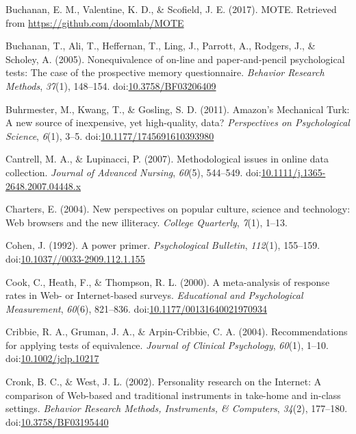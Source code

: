 \documentclass[english,man, mask]{apa6}
\theoremstyle{definition}
\theoremstyle{definition}
\theoremstyle{definition}
\theoremstyle{remark}
\begin{document}
\hypertarget{ref-Buchanan2017}{}
Buchanan, E. M., Valentine, K. D., \& Scofield, J. E. (2017). MOTE.
Retrieved from \url{https://github.com/doomlab/MOTE}

\hypertarget{ref-Buchanan2005}{}
Buchanan, T., Ali, T., Heffernan, T., Ling, J., Parrott, A., Rodgers,
J., \& Scholey, A. (2005). Nonequivalence of on-line and
paper-and-pencil psychological tests: The case of the prospective memory
questionnaire. \emph{Behavior Research Methods}, \emph{37}(1), 148--154.
doi:\href{https://doi.org/10.3758/BF03206409}{10.3758/BF03206409}

\hypertarget{ref-Buhrmester2011}{}
Buhrmester, M., Kwang, T., \& Gosling, S. D. (2011). Amazon's Mechanical
Turk: A new source of inexpensive, yet high-quality, data?
\emph{Perspectives on Psychological Science}, \emph{6}(1), 3--5.
doi:\href{https://doi.org/10.1177/1745691610393980}{10.1177/1745691610393980}

\hypertarget{ref-Cantrell2007}{}
Cantrell, M. A., \& Lupinacci, P. (2007). Methodological issues in
online data collection. \emph{Journal of Advanced Nursing},
\emph{60}(5), 544--549.
doi:\href{https://doi.org/10.1111/j.1365-2648.2007.04448.x}{10.1111/j.1365-2648.2007.04448.x}

\hypertarget{ref-Charters2004}{}
Charters, E. (2004). New perspectives on popular culture, science and
technology: Web browsers and the new illiteracy. \emph{College
Quarterly}, \emph{7}(1), 1--13.

\hypertarget{ref-Cohen1992a}{}
Cohen, J. (1992). A power primer. \emph{Psychological Bulletin},
\emph{112}(1), 155--159.
doi:\href{https://doi.org/10.1037//0033-2909.112.1.155}{10.1037//0033-2909.112.1.155}

\hypertarget{ref-Cook2000}{}
Cook, C., Heath, F., \& Thompson, R. L. (2000). A meta-analysis of
response rates in Web- or Internet-based surveys. \emph{Educational and
Psychological Measurement}, \emph{60}(6), 821--836.
doi:\href{https://doi.org/10.1177/00131640021970934}{10.1177/00131640021970934}

\hypertarget{ref-Cribbie2004}{}
Cribbie, R. A., Gruman, J. A., \& Arpin-Cribbie, C. A. (2004).
Recommendations for applying tests of equivalence. \emph{Journal of
Clinical Psychology}, \emph{60}(1), 1--10.
doi:\href{https://doi.org/10.1002/jclp.10217}{10.1002/jclp.10217}

\hypertarget{ref-Cronk2002}{}
Cronk, B. C., \& West, J. L. (2002). Personality research on the
Internet: A comparison of Web-based and traditional instruments in
take-home and in-class settings. \emph{Behavior Research Methods,
Instruments, \& Computers}, \emph{34}(2), 177--180.
doi:\href{https://doi.org/10.3758/BF03195440}{10.3758/BF03195440}
\end{document}
